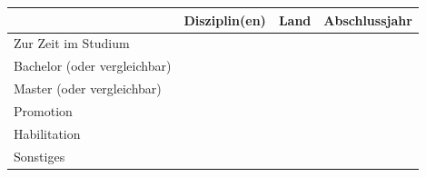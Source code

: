 \documentclass{scrartcl}
\begin{document}
\begin{table}[h]
   \centering
   \begin{tabular}{lccc}
      \hline
                                     & \textbf{Disziplin(en)}   & \textbf{Land}   & \textbf{Abschlussjahr}   \\
      \hline\hline
      Zur Zeit im Studium            &                          &                 &                          \\
      Bachelor (oder vergleichbar)   &                          &                 &                          \\
      Master (oder vergleichbar)     &                          &                 &                          \\
      Promotion                      &                          &                 &                          \\
      Habilitation                   &                          &                 &                          \\
      Sonstiges                      &                          &                 &                          \\
      \hline
   \end{tabular}
\end{table}
\end{document}
